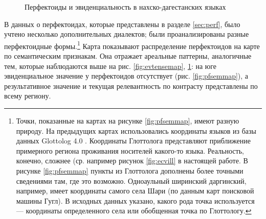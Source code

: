 \begin{figure}[H]
\centering
\caption{Перфектоиды и эвиденциальность в нахско-дагестанских языках}
\label{fig:evpfmap}
\vspace{0.7cm}
\end{figure}

В данных о перфектоидах, которые представлены в разделе \ref{sec:perf}, было учтено несколько дополнительных диалектов; были проанализированы разные перфектоидные формы.\footnote{Точки, показанные на картах на рисунке \ref{fig:pfsemmap}, имеют разную природу. На предыдущих картах использовались координаты языков из базы данных Glottolog 4.0 \citep{glottolog}. Координаты Глоттолога представляют приближение примерного региона проживания носителей какого-то языка. Реальность, конечно, сложнее (ср. например рисунок \ref{fig:ecvill} в настоящей работе. В рисунке \ref{fig:pfsemmap} пункты из Глоттолога дополнены более точными сведениями там, где это возможно. Одноаульный ширинский даргинский, например, имеет координаты самого села Шари (по данным карт поисковой машины Гугл). В исходных данных указано, какого рода точка используется --- координаты определенного села или обобщенная точка по Глоттологу.} Карта показывают распределение перфектоидов на карте по семантическим признакам. Она отражает ареальные паттерны, аналогичные тем, которые наблюдаются выше на рис. \ref{fig:evtensemap}, \ref{fig:evpfmap}: на юге эвиденциальное значение у перфектоидов отсутствует (рис. \ref{fig:pfsemmap}), а результативное значение и текущая релевантность по контрасту представлены по всему региону.

